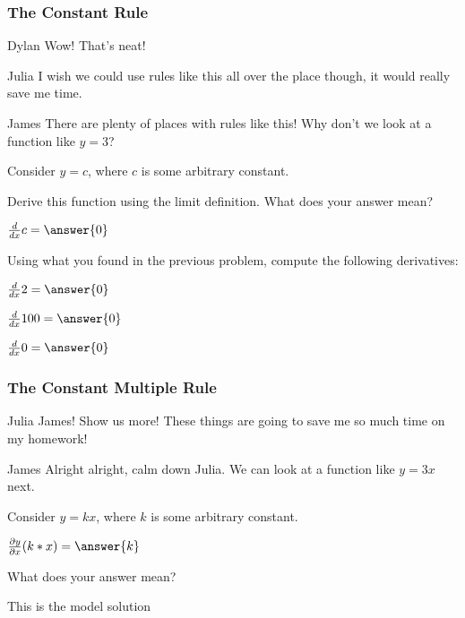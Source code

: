 \documentclass{ximera}
\begin{document}
\subsubsection{The Constant Rule}
\begin{dialogue}
\item[Dylan] Wow! That's neat!
\item[Julia] I wish we could use rules like this all over the place though, it would really save me time.
\item[James] There are plenty of places with rules like this! Why don't we look at a function like $y = 3$?
\end{dialogue}

Consider $y = c$, where $c$ is some arbitrary constant.
\begin{question}
Derive this function using the limit definition. What does your answer mean?

$ \frac{d}{dx} c =  \answer{0}$
\begin{freeResponse}
\end{freeResponse}
\end{question}

\begin{question}
Using what you found in the previous problem, compute the following derivatives:

$\frac{d}{dx} 2 =  \answer{0}$

$\frac{d}{dx} 100 =  \answer{0}$

$ \frac{d}{dx} 0 =  \answer{0}$

\end{question}

\subsubsection{The Constant Multiple Rule}
\begin{dialogue}
\item[Julia] James! Show us more! These things are going to save me so much time on my homework!
\item[James] Alright alright, calm down Julia. We can look at a function like $y = 3x$ next.
\end{dialogue}

Consider $y = kx$, where $k$ is some arbitrary constant.
\begin{question}
$ \frac{\partial y}{\partial x} (k*x) =  \answer{k}$
\item{What does your answer mean?}
\begin{freeResponse}
This is the model solution %
\end{freeResponse}
\end{question}
\end{document}

